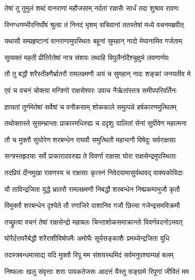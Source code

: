 
\twolineshloka
{तेषां तु तुमुलं शब्दं वानराणां महौजसाम्}
{नर्दतां राक्षसैः सार्धं तदा शुश्राव रावणः} %

\twolineshloka
{स्निग्धगम्भीरनिर्घोषं श्रुत्वा तं निनदं भृशम्}
{सचिवानां ततस्तेषां मध्ये वचनमब्रवीत्} %

\twolineshloka
{यथासौ सम्प्रहृष्टानां वानराणामुपस्थितः}
{बहूनां सुमहान् नादो मेघानामिव गर्जताम्} %

\twolineshloka
{सुव्यक्तं महती प्रीतिरेतेषां नात्र संशयः}
{तथाहि विपुलैर्नादैश्चुक्षुभे लवणार्णवः} %

\twolineshloka
{तौ तु बद्धौ शरैस्तीक्ष्णैर्भ्रातरौ रामलक्ष्मणौ}
{अयं च सुमहान् नादः शङ्कां जनयतीव मे} %

\twolineshloka
{एवं च वचनं चोक्त्वा मन्त्रिणो राक्षसेश्वरः}
{उवाच नैर्ऋतांस्तत्र समीपपरिवर्तिनः} %

\twolineshloka
{ज्ञायतां तूर्णमेतेषां सर्वेषां च वनौकसाम्}
{शोककाले समुत्पन्ने हर्षकारणमुत्थितम्} %

\twolineshloka
{तथोक्तास्ते सुसम्भ्रान्ताः प्राकारमधिरुह्य च}
{ददृशुः पालितां सेनां सुग्रीवेण महात्मना} %

\twolineshloka
{तौ च मुक्तौ सुघोरेण शरबन्धेन राघवौ}
{समुत्थितौ महाभागौ विषेदुः सर्वराक्षसाः} %

\twolineshloka
{सन्त्रस्तहृदयाः सर्वे प्राकारादवरुह्य ते}
{विवर्णा राक्षसा घोरा राक्षसेन्द्रमुपस्थिताः} %

\twolineshloka
{तदप्रियं दीनमुखा रावणस्य च राक्षसाः}
{कृत्स्नं निवेदयामासुर्यथावद् वाक्यकोविदाः} %

\twolineshloka
{यौ ताविन्द्रजिता युद्धे भ्रातरौ रामलक्ष्मणौ}
{निबद्धौ शरबन्धेन निष्प्रकम्पभुजौ कृतौ} %

\twolineshloka
{विमुक्तौ शरबन्धेन दृश्येते तौ रणाजिरे}
{पाशानिव गजौ छित्त्वा गजेन्द्रसमविक्रमौ} %

\twolineshloka
{तच्छ्रुत्वा वचनं तेषां राक्षसेन्द्रो महाबलः}
{चिन्ताशोकसमाक्रान्तो विवर्णवदनोऽभवत्} %

\twolineshloka
{घोरैर्दत्तवरैर्बद्धौ शरैराशीविषोपमैः}
{अमोघैः सूर्यसङ्काशैः प्रमथ्येन्द्रजिता युधि} %

\twolineshloka
{तदस्त्रबन्धमासाद्य यदि मुक्तौ रिपू मम}
{संशयस्थमिदं सर्वमनुपश्याम्यहं बलम्} %

\twolineshloka
{निष्फलाः खलु संवृत्ताः शराः पावकतेजसः}
{आदत्तं यैस्तु सङ्ग्रामे रिपूणां जीवितं मम} %

